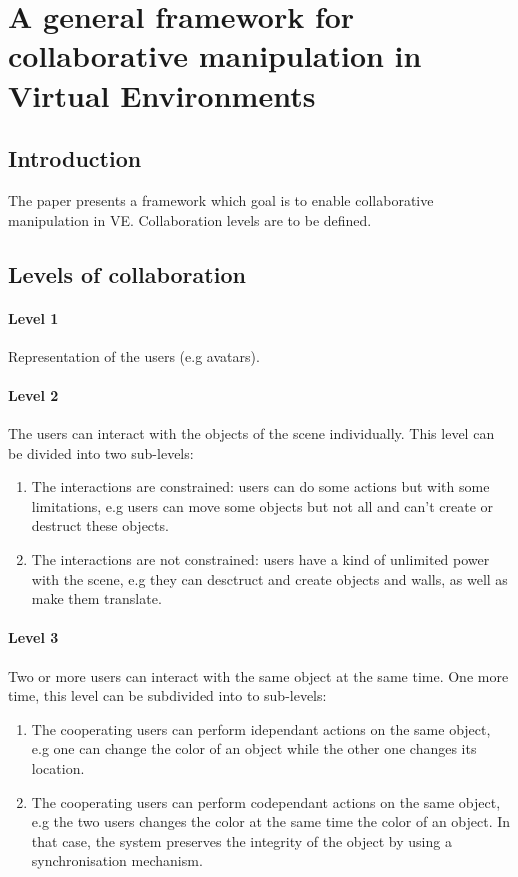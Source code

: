 \documentclass[a4paper]{article}
\begin{document}
\section{A general framework for collaborative manipulation in Virtual Environments}

\subsection{Introduction}
The paper presents a framework which goal is to enable collaborative manipulation in VE. Collaboration levels are to be defined.

\subsection{Levels of collaboration}
\paragraph{Level 1} Representation of the users (e.g avatars).
\paragraph{Level 2} The users can interact with the objects of the scene individually. This level can be divided into two sub-levels:
\begin{enumerate}
	\item The interactions are constrained: users can do some actions but with some limitations, e.g users can move some objects but not all and can't create or destruct these objects.
	\item The interactions are not constrained: users have a kind of unlimited power with the scene, e.g they can desctruct and create objects and walls, as well as make them translate.
\end{enumerate}

\paragraph{Level 3} Two or more users can interact with the same object at the same time. One more time, this level can be subdivided into to sub-levels:
\begin{enumerate}
	\item The cooperating users can perform idependant actions on the same object, e.g one can change the color of an object while the other one changes its location.
	\item The cooperating users can perform codependant actions on the same object, e.g the two users changes the color at the same time the color of an object. In that case, the system preserves the integrity of the object by using a synchronisation mechanism.
\end{enumerate}
\end{document}
